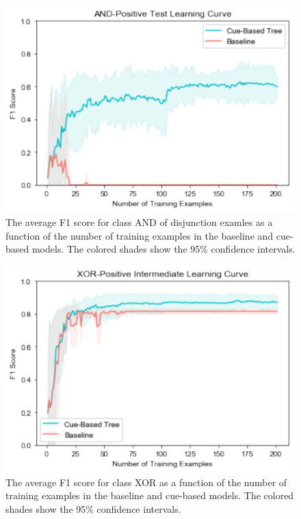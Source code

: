 \documentclass[floatsintext,man]{apa6}
\theoremstyle{definition}
\theoremstyle{definition}
\theoremstyle{definition}
\theoremstyle{remark}
\begin{document}
\begin{figure}
\centering
\includegraphics{figs/ANDintermediateDis-1.pdf}
\caption{\label{fig:ANDintermediateDis}The average F1 score for class AND of
disjunction examles as a function of the number of training examples in
the baseline and cue-based models. The colored shades show the 95\%
confidence intervals.}
\end{figure}

\begin{figure}
\centering
\includegraphics{figs/XORintermediate-1.pdf}
\caption{\label{fig:XORintermediate}The average F1 score for class XOR as a
function of the number of training examples in the baseline and
cue-based models. The colored shades show the 95\% confidence
intervals.}
\end{figure}
\end{document}
